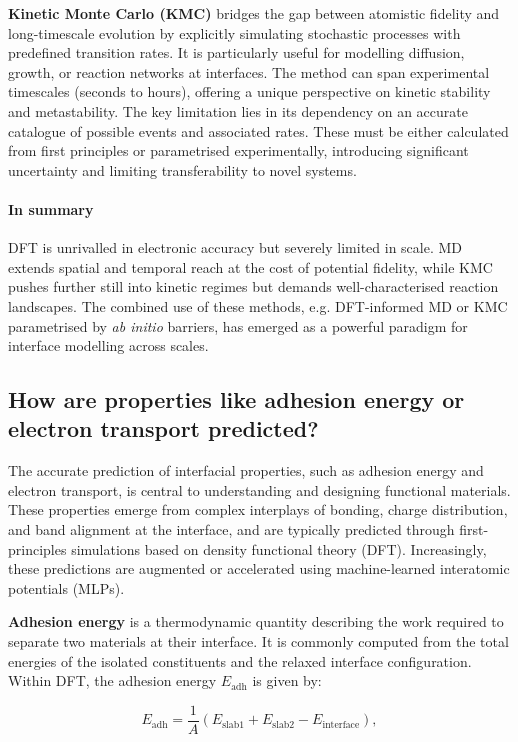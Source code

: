 \textbf{Kinetic Monte Carlo (KMC)} bridges the gap between atomistic fidelity and long-timescale evolution by explicitly simulating stochastic processes with predefined transition rates. It is particularly useful for modelling diffusion, growth, or reaction networks at interfaces. The method can span experimental timescales (seconds to hours), offering a unique perspective on kinetic stability and metastability. The key limitation lies in its dependency on an accurate catalogue of possible events and associated rates. These must be either calculated from first principles or parametrised experimentally, introducing significant uncertainty and limiting transferability to novel systems. 
 
\paragraph{In summary} DFT is unrivalled in electronic accuracy but severely limited in scale. MD extends spatial and temporal reach at the cost of potential fidelity, while KMC pushes further still into kinetic regimes but demands well-characterised reaction landscapes. The combined use of these methods, e.g. DFT-informed MD or KMC parametrised by \textit{ab initio} barriers, has emerged as a powerful paradigm for interface modelling across scales. 
 
\subsection{How are properties like adhesion energy or electron transport predicted?} 
 
The accurate prediction of interfacial properties, such as adhesion energy and electron transport, is central to understanding and designing functional materials. These properties emerge from complex interplays of bonding, charge distribution, and band alignment at the interface, and are typically predicted through first-principles simulations based on density functional theory (DFT). Increasingly, these predictions are augmented or accelerated using machine-learned interatomic potentials (MLPs). 
 
\textbf{Adhesion energy} is a thermodynamic quantity describing the work required to separate two materials at their interface. It is commonly computed from the total energies of the isolated constituents and the relaxed interface configuration. Within DFT, the adhesion energy $E_\mathrm{adh}$ is given by: 
 
\[ E_\mathrm{adh} = \frac{1}{A} \left( E_\mathrm{slab1} + E_\mathrm{slab2} - E_\mathrm{interface} \right), \] 
 
